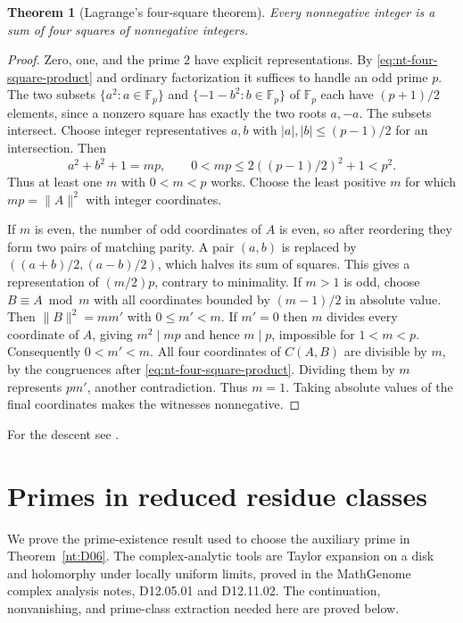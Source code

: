 \documentclass[11pt,oneside,openany]{book}
\theoremstyle{plain}
\newtheorem{theorem}{Theorem}[chapter]
\theoremstyle{definition}
\theoremstyle{remark}
\begin{document}
\begin{theorem}[Lagrange's four-square theorem]\label{nt:D05}
Every nonnegative integer is a sum of four squares of nonnegative
integers.
\end{theorem}
\begin{proof}
Zero, one, and the prime \(2\) have explicit representations.
By \eqref{eq:nt-four-square-product} and ordinary factorization
it suffices to handle an odd prime \(p\). The two subsets
\(\{a^2:a\in\mathbb F_p\}\) and \(\{-1-b^2:b\in\mathbb F_p\}\)
of \(\mathbb F_p\) each have \((p+1)/2\) elements, since a nonzero
square has exactly the two roots \(a,-a\). The subsets intersect.
Choose integer representatives \(a,b\) with
\(|a|,|b|\le(p-1)/2\) for an intersection. Then
\[
 a^2+b^2+1=mp,\qquad 0<mp\le 2((p-1)/2)^2+1<p^2.
\]
Thus at least one \(m\) with \(0<m<p\) works. Choose the least
positive \(m\) for which \(mp=\|A\|^2\) with integer coordinates.

If \(m\) is even, the number of odd coordinates of \(A\) is even,
so after reordering they form two pairs of matching parity. A pair
\((a,b)\) is replaced by \(((a+b)/2,(a-b)/2)\), which halves its
sum of squares. This gives a representation of \((m/2)p\),
contrary to minimality. If \(m>1\) is odd, choose \(B\equiv A\bmod m\)
with all coordinates bounded by \((m-1)/2\) in absolute value.
Then \(\|B\|^2=mm'\) with \(0\le m'<m\). If \(m'=0\) then \(m\)
divides every coordinate of \(A\), giving \(m^2\mid mp\) and hence
\(m\mid p\), impossible for \(1<m<p\). Consequently \(0<m'<m\).
All four coordinates of \(C(A,B)\) are divisible by \(m\), by the
congruences after \eqref{eq:nt-four-square-product}. Dividing them
by \(m\) represents \(pm'\), another contradiction. Thus \(m=1\).
Taking absolute values of the final coordinates makes the witnesses
nonnegative.
\end{proof}
For the descent see \cite[Chapter XX]{hardy-wright}.

\section{Primes in reduced residue classes}

We prove the prime-existence result used to choose the auxiliary
prime in Theorem~\ref{nt:D06}. The complex-analytic tools are Taylor
expansion on a disk and holomorphy under locally uniform limits, proved
in the MathGenome complex analysis notes, D12.05.01 and D12.11.02.
The continuation, nonvanishing, and prime-class extraction needed here
are proved below.
\end{document}

